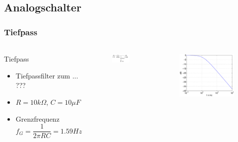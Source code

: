 \subsection{Analogschalter} %
\label{sub:Analogschalter}
\begin{frame}
\frametitle{Tiefpass}
\framesubtitle{}
    \begin{columns}[c]
             \begin{block}{Tiefpass}
                 \begin{itemize}
                     \item Tiefpassfilter zum ... ???
                     \item $R=10k\Omega$, $C = 10\mu F$
                     \item Grenzfrequenz 
                     \begin{equation*}
                         f_G = \frac{1}{2 \pi R C} = 1.59Hz
                     \end{equation*}
                 \end{itemize}
             \end{block}
        \begin{figure}[H]
        \begin{center}
                \includegraphics[scale=0.4]{./img/schaltung/Tiefpass.png}
        \end{center}
        \end{figure}
        \begin{figure}[H]
        \begin{center}
                \includegraphics[scale=0.325]{./img/plots/theorie_tiefpass.eps}
        \end{center}
        \end{figure}
    \end{columns}
\end{frame}
